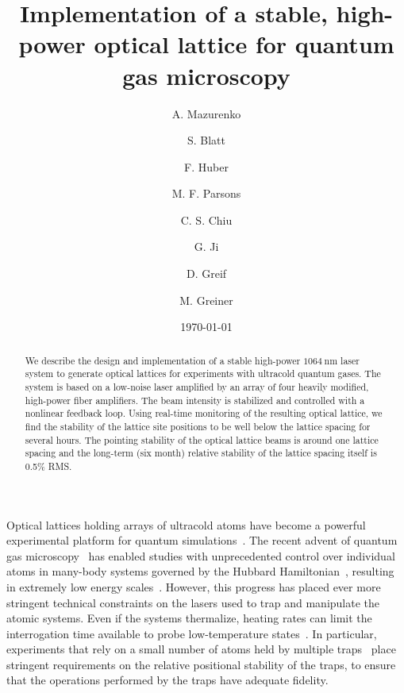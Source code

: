 \documentclass[twocolumn,aps,pra,showpacs,preprintnumbers,bibnotes]{revtex4-1}
\newcommand\unit[2]{\ensuremath{#1~\mathrm{{#2}}}}
\begin{document}
\title{Implementation of a stable, high-power optical lattice for quantum gas microscopy}

\author{A. Mazurenko}
\author{S. Blatt}
\author{F. Huber}
\author{M. F. Parsons}
\author{C. S. Chiu}
\author{G. Ji}
\author{D. Greif}
\author{M. Greiner}

\date{\today}
\begin{abstract}
We describe the design and implementation of a stable high-power \unit{1064}{nm} laser system to generate optical lattices for experiments with ultracold quantum gases. The system is based on a low-noise laser amplified by an array of four heavily modified, high-power fiber amplifiers. The beam intensity is stabilized and controlled with a nonlinear feedback loop. 
Using real-time monitoring of the resulting optical lattice, we find the stability of the lattice site positions to be well below the lattice spacing for several hours. The pointing stability of the optical lattice beams is around one lattice spacing and the long-term (six month) relative stability of the lattice spacing itself is 0.5\% RMS.
\end{abstract}
\maketitle

Optical lattices holding arrays of ultracold atoms have become a powerful experimental platform for quantum simulations~\cite{Friedenauer2008, Kim2010, Struck2011, Simon2011, Yan2013, Greif2013, Drewes2016, Murmann2015}.
The recent advent of quantum gas microscopy~\cite{Bakr2009, Sherson2010, Haller2015, Cheuk2015, Parsons2015, Edge2015, Omran2015, Greif2016, Cheuk2016, Parsons2016, Boll2016, Cheuk2016a, Brown2017} has enabled studies with unprecedented control over individual atoms in many-body systems governed by the Hubbard Hamiltonian~\cite{Hubbard1963}, resulting in extremely low energy scales~\cite{Mazurenko2017, Chiu2018}.
However, this progress has placed ever more stringent technical constraints on the lasers used to trap and manipulate the atomic systems.
Even if the systems thermalize, heating rates can limit the interrogation time available to probe low-temperature states~\cite{Blatt2015}.
In particular, experiments that rely on a small number of atoms held by multiple traps~\cite{Preiss2015, Choi2016, Mazurenko2017, Chiu2018} place stringent requirements on the relative positional stability of the traps, to ensure that the operations performed by the traps have adequate fidelity.
\end{document}
